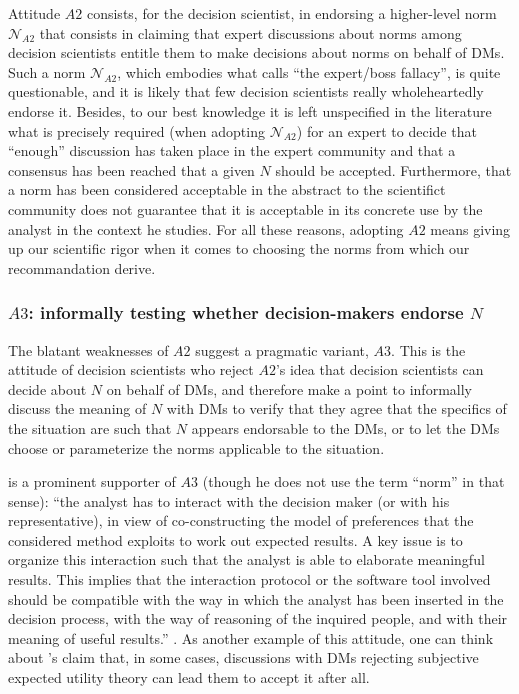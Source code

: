 \documentclass[preprint, french, english, 11pt, authoryear]{elsarticle}%
\newcommand{\protectforpdf}[1]{\texorpdfstring{\ensuremath{#1}}{#1}}
\begin{document}
Attitude $A2$ consists, for the decision scientist, in endorsing a higher-level norm $\mathscr{N}_{A2}$ that consists in claiming that expert discussions about norms among decision scientists entitle them to make decisions about norms on behalf of \acp{DM}. Such a norm $\mathscr{N}_{A2}$, which embodies what \citet{estlund_democratic_2009} calls “the expert/boss fallacy”, is quite questionable, and it is likely that few decision scientists really wholeheartedly endorse it. Besides, to our best knowledge it is left unspecified in the literature what is precisely required (when adopting  $\mathscr{N}_{A2}$) for an expert to decide that “enough” discussion has taken place in the expert community and that a consensus has been reached that a given $N$ should be accepted. Furthermore, that a norm has been considered acceptable in the abstract to the scientifict community does not guarantee that it is acceptable in its concrete use by the analyst in the context he studies. For all these reasons, adopting $A2$ means giving up our scientific rigor when it comes to choosing the norms from which our recommandation derive. 

\subsubsection{\protectforpdf{A3}: informally testing whether decision-makers endorse \protectforpdf{N}}
The blatant weaknesses of $A2$ suggest a pragmatic variant, $A3$. This is the attitude of decision scientists who reject $A2$'s idea that decision scientists can decide about $N$ on behalf of \acp{DM}, and therefore make a point to informally discuss the meaning of $N$ with \acp{DM} to verify that they agree that the specifics of the situation are such that $N$ appears endorsable to the \acp{DM}, or to let the \acp{DM} choose or parameterize the norms applicable to the situation.

\citet{roy_multicriteria_1996} is a prominent supporter of $A3$ (though he does not use the term “norm” in that sense): “the analyst has to interact
with the decision maker (or with his representative), in view of co-constructing the model of preferences that the considered method exploits to work out expected
results. A key issue is to organize this interaction such that the analyst is able to
elaborate meaningful results. This implies that the interaction protocol or the
software tool involved should be compatible with the way in which the analyst has
been inserted in the decision process, with the way of reasoning of the inquired
people, and with their meaning of useful results.” \citep[pp. 84--85]{roy_questions_2013}. As another example of this attitude, one can think about \citet{raiffa_back_1985}’s claim that, in some cases, discussions with \acp{DM} rejecting subjective expected utility theory can lead them to accept it after all.
\end{document}
